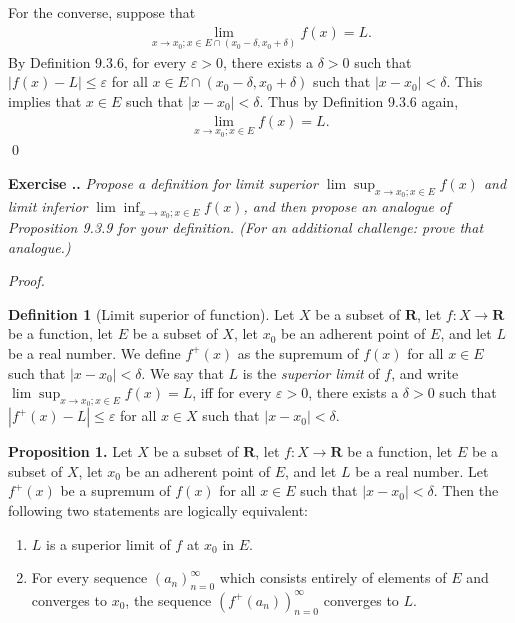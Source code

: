 \documentclass{book}
\newcommand{\pff}{\vspace{.25em}\noindent\emph{Proof.}~~}
\newcommand{\titl}[1]{\noindent\textbf{#1}}
\newcounter{Exercise}[section]
\renewcommand{\theExercise}{\thesection.\arabic{Exercise}.}
\newcommand{\new}{\vspace{1.5em}\noindent\textbf{{Exercise \stepcounter{Exercise}\textbf{\theExercise}}} }
\begin{document}
For the converse, suppose that
    \begin{align*}
        \lim_{x\to x_0;x\in E\cap(x_0-\delta,x_0+\delta)}f(x)=L.
    \end{align*}
By Definition 9.3.6, for every $\varepsilon>0$, there exists a $\delta>0$ such that $|f(x)-L|\leq\varepsilon$ for all $x\in E\cap(x_0-\delta,x_0+\delta)$ such that $|x-x_0|<\delta$. This implies that $x\in E$ such that $|x-x_0|<\delta$. Thus by Definition 9.3.6 again,
    \begin{align*}
        \lim_{x\to x_0;x\in E}f(x)=L.
    \end{align*}\qed

\new\emph{Propose a definition for limit superior $\lim\sup_{x\to x_0;x\in E}f(x)$ and limit inferior $\lim\inf_{x\to x_0;x\in E}f(x)$, and then propose an analogue of Proposition 9.3.9 for your definition. (For an additional challenge: prove that analogue.)}

\pff
\begin{framed}
\titl{Definition 1} (Limit superior of function). Let $X$ be a subset of $\mathbf{R}$, let $f:X\to\mathbf{R}$ be a function, let $E$ be a subset of $X$, let $x_0$ be an adherent point of $E$, and let $L$ be a real number. We define $f^+(x)$ as the supremum of $f(x)$ for all $x\in E$ such that $|x-x_0|<\delta$. We say that $L$ is the \emph{superior limit} of $f$, and write $\lim\sup_{x\to x_0;x\in E}f(x)=L$, iff for every $\varepsilon>0$, there exists a $\delta>0$ such that $|f^+(x)-L|\leq\varepsilon$ for all $x\in X$ such that $|x-x_0|<\delta$.
\end{framed}

\begin{framed}
\titl{Proposition 1.} Let $X$ be a subset of $\mathbf{R}$, let $f:X\to\mathbf{R}$ be a function, let $E$ be a subset of $X$, let $x_0$ be an adherent point of $E$, and let $L$ be a real number. Let $f^+(x)$ be a supremum of $f(x)$ for all $x\in E$ such that $|x-x_0|<\delta$. Then the following two statements are logically equivalent:
\begin{enumerate}
    \item $L$ is a superior limit of $f$ at $x_0$ in $E$.
    \item For every sequence $(a_n)_{n=0}^{\infty}$ which consists entirely of elements of $E$ and converges to $x_0$, the sequence $(f^+(a_n))_{n=0}^{\infty}$ converges to $L$.
\end{enumerate}
\end{framed}
\end{document}
